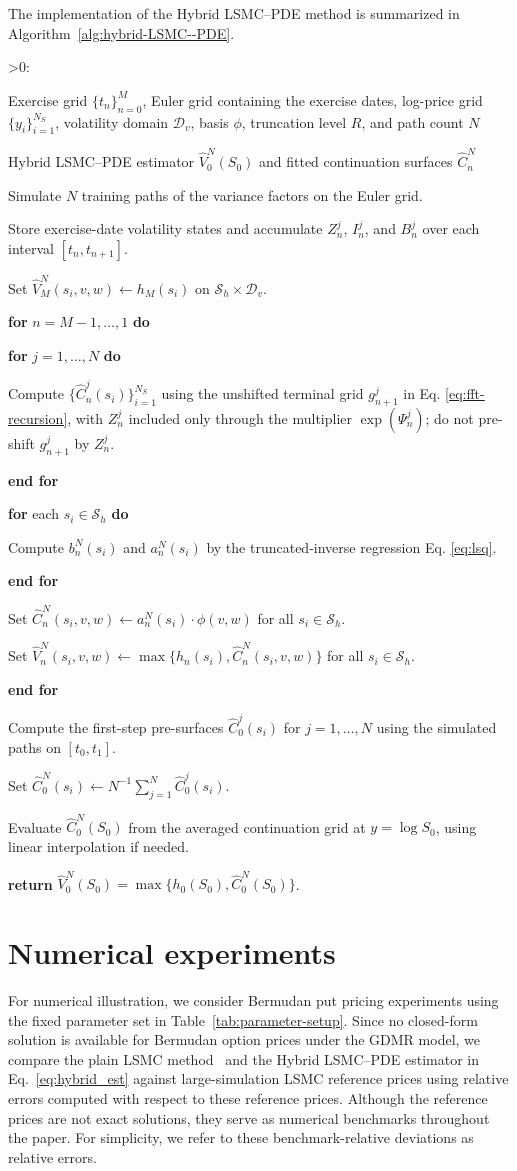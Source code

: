 \documentclass[pdflatex,sn-mathphys-num]{sn-jnl}
\makeatletter
\newcounter{ALG@line}
\newenvironment{algorithmic}[1][0]{%
  \setcounter{ALG@line}{0}%
  \def\ALG@freq{#1}%
  \begin{list}{\ifnum\ALG@freq>0\refstepcounter{ALG@line}\arabic{ALG@line}:\fi}{%
\setlength{\leftmargin}{2.2em}%
\setlength{\labelwidth}{1.8em}%
\setlength{\labelsep}{0.4em}%
\setlength{\itemsep}{2pt}%
\setlength{\parsep}{0pt}%
\setlength{\topsep}{3pt}%
  }%
}{\end{list}}
\newcommand{\Require}{\item[\textbf{Require:}]}
\newcommand{\Ensure}{\item[\textbf{Ensure:}]}
\newcommand{\State}{\item}
\newcommand{\For}[1]{\State \textbf{for} #1 \textbf{do}}
\newcommand{\EndFor}{\State \textbf{end for}}
\theoremstyle{thmstyleone}%
\theoremstyle{thmstylethree}%
\theoremstyle{thmstyletwo}%
\makeatother
\begin{document}
The implementation of the Hybrid LSMC--PDE method is summarized in Algorithm~\ref{alg:hybrid-LSMC--PDE}.
\begin{algorithm}[H]
\caption{Hybrid LSMC--PDE recursion}\label{alg:hybrid-LSMC--PDE}
\begin{algorithmic}[1]
\Require Exercise grid $\{t_n\}_{n=0}^M$, Euler grid containing the exercise dates, log-price grid $\{y_i\}_{i=1}^{N_S}$, volatility domain $\mathcal D_v$, basis $\phi$, truncation level $R$, and path count $N$
\Ensure Hybrid LSMC--PDE estimator $\widehat V_0^N(S_0)$ and fitted continuation surfaces $\widehat C_n^N$
\State Simulate $N$ training paths of the variance factors on the Euler grid.
\State Store exercise-date volatility states and accumulate $Z_n^j$, $I_n^j$, and $B_n^j$ over each interval $[t_n,t_{n+1}]$.
\State Set $\widehat V_M^N(s_i,v,w)\gets h_M(s_i)$ on $\mathcal S_h\times\mathcal D_v$.
\For{$n=M-1,\ldots,1$}
\For{$j=1,\ldots,N$}
\State Compute $\{\widehat C_n^j(s_i)\}_{i=1}^{N_S}$ using the unshifted terminal grid $g_{n+1}^j$ in Eq. \eqref{eq:fft-recursion}, with $Z_n^j$ included only through the multiplier $\exp(\Psi_n^j)$; do not pre-shift $g_{n+1}^j$ by $Z_n^j$.
\EndFor
\For{each $s_i\in\mathcal S_h$}
\State Compute $b_n^N(s_i)$ and $a_n^N(s_i)$ by the truncated-inverse regression Eq. \eqref{eq:lsq}.
\EndFor
\State Set $\widehat C_n^N(s_i,v,w)\gets a_n^N(s_i)\cdot\phi(v,w)$ for all $s_i\in\mathcal S_h$.
\State Set $\widehat V_n^N(s_i,v,w)\gets\max\{h_n(s_i),\widehat C_n^N(s_i,v,w)\}$ for all $s_i\in\mathcal S_h$.
\EndFor
\State Compute the first-step pre-surfaces $\widehat C_0^j(s_i)$ for $j=1,\ldots,N$ using the simulated paths on $[t_0,t_1]$.
\State Set $\widehat C_0^N(s_i)\gets N^{-1}\sum_{j=1}^{N}\widehat C_0^j(s_i)$.
\State Evaluate $\widehat C_0^N(S_0)$ from the averaged continuation grid at $y=\log S_0$, using linear interpolation if needed.
\State \textbf{return} $\widehat V_0^N(S_0)=\max\{h_0(S_0),\widehat C_0^N(S_0)\}$.
\end{algorithmic}
\end{algorithm}
\section{Numerical experiments}\label{sec:numerical}


For numerical illustration, we consider Bermudan put pricing experiments using the fixed parameter set in Table~\ref{tab:parameter-setup}.  Since no closed-form solution is available for Bermudan option prices under the GDMR model, we compare the plain LSMC method~\cite{longstaff2001valuing} and the Hybrid LSMC--PDE estimator in Eq.~\eqref{eq:hybrid_est} against large-simulation LSMC reference prices using relative errors computed with respect to these reference prices. Although the reference prices are not exact solutions, they serve as numerical benchmarks throughout the paper. For simplicity, we refer to these benchmark-relative deviations as relative errors.
\end{document}
